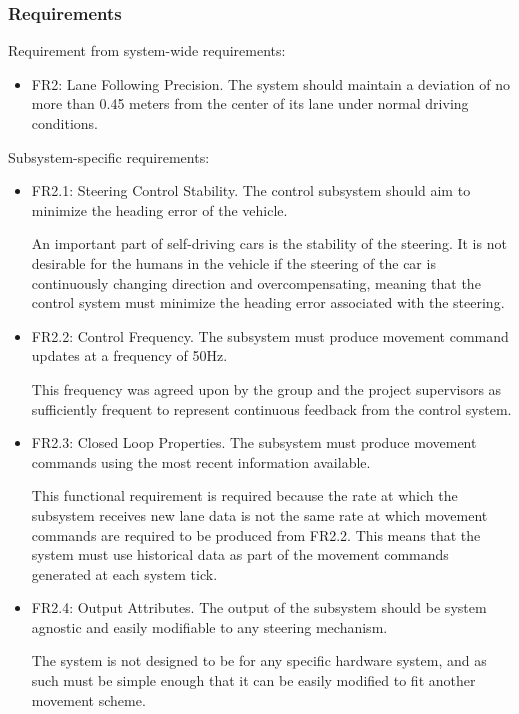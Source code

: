 \documentclass[titlepage]{article}
\begin{document}
\subsubsection{Requirements}
Requirement from system-wide requirements:

\begin{itemize}
	\item FR2: Lane Following Precision. The system should maintain a deviation of no more than 0.45 meters from the center of its lane under normal driving conditions.
\end{itemize}
Subsystem-specific requirements:
\begin{itemize}


	\item FR2.1: Steering Control Stability. The control subsystem should aim to minimize the heading error of the vehicle.

	      An important part of self-driving cars is the stability of the steering. It is not desirable for the humans in the vehicle if the steering of the car is continuously changing direction and overcompensating, meaning that the control system must minimize the heading error associated with the steering.

	\item FR2.2: Control Frequency.
	      The subsystem must produce movement command updates at a frequency of 50Hz.

	      This frequency was agreed upon by the group and the project supervisors as sufficiently frequent to represent continuous feedback from the control system.

	\item FR2.3: Closed Loop Properties.
	      The subsystem must produce movement commands using the most recent information available.

	      This functional requirement is required because the rate at which the subsystem receives new lane data is not the same rate at which movement commands are required to be produced from FR2.2. This means that the system must use historical data as part of the movement commands generated at each system tick.

	\item FR2.4: Output Attributes. The output of the subsystem should be system agnostic and easily modifiable to any steering mechanism.

	      The system is not designed to be for any specific hardware system, and as such must be simple enough that it can be easily modified to fit another movement scheme.
\end{itemize}
\end{document}
